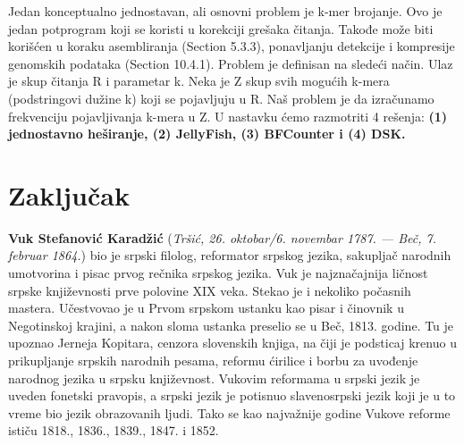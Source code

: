 \documentclass[12pt,oneside]{memoir}
\begin{document}
Jedan konceptualno jednostavan, ali osnovni problem je k-mer brojanje. Ovo je jedan potprogram koji se koristi u korekciji grešaka čitanja. Takođe može biti korišćen u koraku asembliranja (Section 5.3.3), ponavljanju detekcije i kompresije genomskih podataka (Section 10.4.1). Problem je definisan na sledeći način. Ulaz je skup čitanja R i parametar k. Neka je Z skup svih mogućih k-mera (podstringovi dužine k) koji se pojavljuju u R. Naš problem je da izračunamo frekvenciju pojavljivanja k-mera u Z. U nastavku ćemo razmotriti 4 rešenja: \textbf{(1) jednostavno heširanje, (2) JellyFish, (3) BFCounter i (4) DSK.}\\

\chapter{Zaključak}


\literatura

\backmatter

\begin{biografija}
  \textbf{Vuk Stefanović Karadžić} (\emph{Tršić,
    26. oktobar/6. novembar 1787. — Beč, 7. februar 1864.}) bio je
  srpski filolog, reformator srpskog jezika, sakupljač narodnih
  umotvorina i pisac prvog rečnika srpskog jezika.  Vuk je
  najznačajnija ličnost srpske književnosti prve polovine XIX
  veka. Stekao je i nekoliko počasnih mastera.  Učestvovao je u
  Prvom srpskom ustanku kao pisar i činovnik u Negotinskoj krajini, a
  nakon sloma ustanka preselio se u Beč, 1813. godine. Tu je upoznao
  Jerneja Kopitara, cenzora slovenskih knjiga, na čiji je podsticaj
  krenuo u prikupljanje srpskih narodnih pesama, reformu ćirilice i
  borbu za uvođenje narodnog jezika u srpsku književnost. Vukovim
  reformama u srpski jezik je uveden fonetski pravopis, a srpski jezik
  je potisnuo slavenosrpski jezik koji je u to vreme bio jezik
  obrazovanih ljudi. Tako se kao najvažnije godine Vukove reforme
  ističu 1818., 1836., 1839., 1847. i 1852.
\end{biografija}
\end{document}

